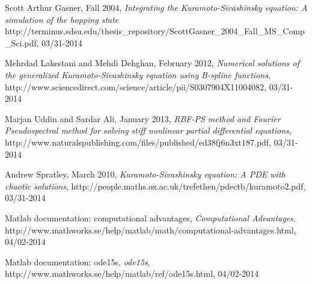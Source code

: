 \documentclass[10pt,a4paper]{article}
\begin{document}
\begin{thebibliography}{9}
Scott Arthur Gasner, Fall 2004,
\emph{Integrating the Kuramoto-Sivashinsky equation: A simulation of the hopping state}
http://terminus.sdsu.edu/thesis\_repository/ScottGasner\_2004\_Fall\_MS\_Comp\_Sci.pdf, 03/31-2014

Mehrdad Lakestani and Mehdi Dehghan, February 2012,
\emph{Numerical solutions of the generalized Kuramoto-Sivashinsky equation using B-spline functions},
http://www.sciencedirect.com/science/article/pii/S0307904X11004082, 03/31-2014

Marjan Uddin and Sardar Ali, January 2013,
\emph{RBF-PS method and Fourier Pseudospectral method for solving stiff 
nonlinear partial differential equations},
http://www.naturalspublishing.com/files/published/ed38fj6n3xt187.pdf, 03/31-2014

Andrew Spratley, March 2010,
\emph{Kuramoto-Sivashinsky equation: A PDE with chaotic solutions},
http://people.maths.ox.ac.uk/trefethen/pdectb/kuramoto2.pdf, 03/31-2014

Matlab documentation: computational advantages,
\emph{Computational Advantages},
http://www.mathworks.se/help/matlab/math/computational-advantages.html, 04/02-2014

Matlab documentation: ode15s,
\emph{ode15s},
http://www.mathworks.se/help/matlab/ref/ode15s.html, 04/02-2014


\end{thebibliography}

\end{document}

